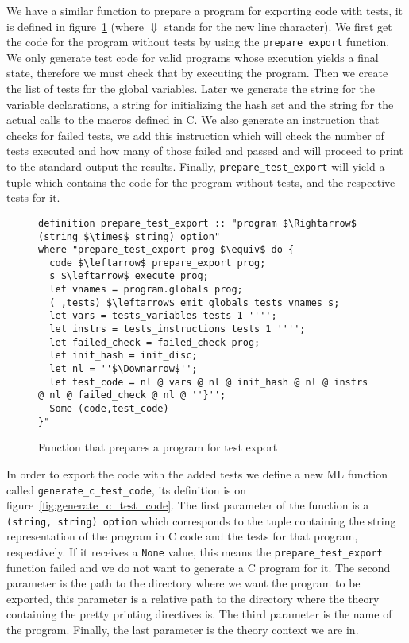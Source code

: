 We have a similar function to prepare a program for exporting code with tests, it is defined in figure~\ref{fig:prepare_test_export} (where $\Downarrow$ stands for the new line character).
We first get the code for the program without tests by using the \verb|prepare_export| function.
We only generate test code for valid programs whose execution yields a final state, therefore we must check that by executing the program.
Then we create the list of tests for the global variables.
Later we generate the string for the variable declarations, a string for initializing the hash set and the string for the actual calls to the macros defined in C.
We also generate an instruction that checks for failed tests, we add this instruction which will check the number of tests executed and how many of those failed and passed and will proceed to print to the standard output the results.
Finally, \verb|prepare_test_export| will yield a tuple which contains the code for the program without tests, and the respective tests for it.

\begin{figure}
\begin{lstlisting}[mathescape=true]
definition prepare_test_export :: "program $\Rightarrow$ (string $\times$ string) option"
where "prepare_test_export prog $\equiv$ do {
  code $\leftarrow$ prepare_export prog;
  s $\leftarrow$ execute prog;
  let vnames = program.globals prog;
  (_,tests) $\leftarrow$ emit_globals_tests vnames s;
  let vars = tests_variables tests 1 '''';
  let instrs = tests_instructions tests 1 '''';
  let failed_check = failed_check prog;
  let init_hash = init_disc;
  let nl = ''$\Downarrow$'';
  let test_code = nl @ vars @ nl @ init_hash @ nl @ instrs @ nl @ failed_check @ nl @ ''}'';
  Some (code,test_code)
}"
\end{lstlisting}

\caption{Function that prepares a program for test export}
\label{fig:prepare_test_export}
\end{figure}


In order to export the code with the added tests we define a new ML function called \verb|generate_c_test_code|, its definition is on figure~\ref{fig:generate_c_test_code}.
The first parameter of the function is a \verb|(string, string) option| which corresponds to the tuple containing the string representation of the program in C code and the tests for that program, respectively.
If it receives a \verb|None| value, this means the \verb|prepare_test_export| function failed and we do not want to generate a C program for it.
The second parameter is the path to the directory where we want the program to be exported, this parameter is a relative path to the directory where the theory containing the pretty printing directives is.
The third parameter is the name of the program.
Finally, the last parameter is the theory context we are in.

